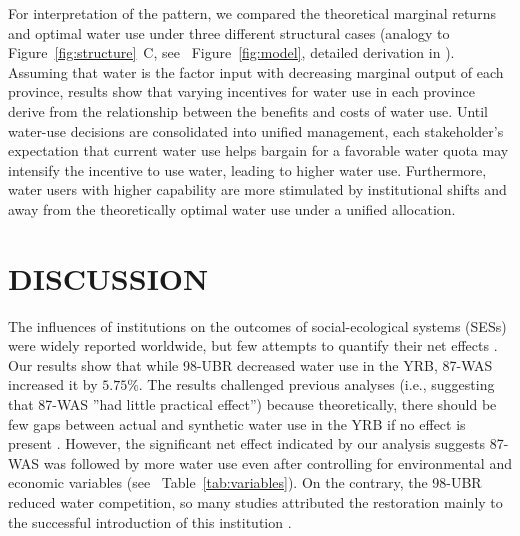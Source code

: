 \documentclass[default, sn-standardnature]{sn-jnl}
\begin{document}
For interpretation of the pattern, we compared the theoretical marginal returns and optimal water use under three different structural cases (analogy to Figure~\ref{fig:structure}~C, see ~Figure~\ref{fig:model}, detailed derivation in \textit{}).
Assuming that water is the factor input with decreasing marginal output of each province, results show that varying incentives for water use in each province derive from the relationship between the benefits and costs of water use.
Until water-use decisions are consolidated into unified management, each stakeholder’s expectation that current water use helps bargain for a favorable water quota may intensify the incentive to use water, leading to higher water use.
Furthermore, water users with higher capability are more stimulated by institutional shifts and away from the theoretically optimal water use under a unified allocation.


\section{DISCUSSION}\label{sec:discussion}

\label{discussion-1}
The influences of institutions on the outcomes of social-ecological systems (SESs) were widely reported worldwide, but few attempts to quantify their net effects \cite{cumming2020a}.
Our results show that while 98-UBR decreased water use in the YRB, 87-WAS increased it by $5.75\%$.
The results challenged previous analyses (i.e., suggesting that 87-WAS ''had little practical effect'') because theoretically, there should be few gaps between actual and synthetic water use in the YRB if no effect is present \cite{abadie2015,hill2021}.
However, the significant net effect indicated by our analysis suggests 87-WAS was followed by more water use even after controlling for environmental and economic variables (see \textit{}~Table~\ref{tab:variables}).
On the contrary, the 98-UBR reduced water competition, so many studies attributed the restoration mainly to the successful introduction of this institution \cite{chen2021,huangang2002,an2007}.
\end{document}
